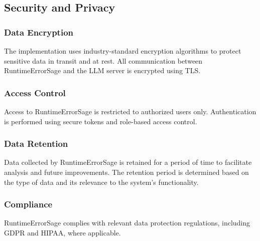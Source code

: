 \subsection{Security and Privacy}

\subsubsection{Data Encryption}
The implementation uses industry-standard encryption algorithms to protect sensitive data in transit and at rest. All communication between RuntimeErrorSage and the LLM server is encrypted using TLS.

\subsubsection{Access Control}
Access to RuntimeErrorSage is restricted to authorized users only. Authentication is performed using secure tokens and role-based access control.

\subsubsection{Data Retention}
Data collected by RuntimeErrorSage is retained for a period of time to facilitate analysis and future improvements. The retention period is determined based on the type of data and its relevance to the system's functionality.

\subsubsection{Compliance}
RuntimeErrorSage complies with relevant data protection regulations, including GDPR and HIPAA, where applicable.
